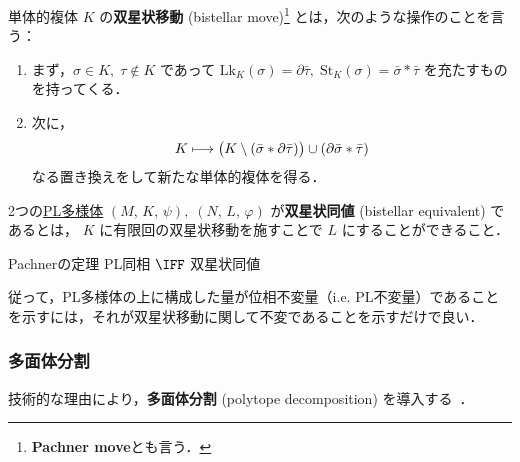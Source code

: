 \documentclass[TQFT_main]{subfiles}
\begin{document}
単体的複体 $K$ の\textbf{双星状移動} (bistellar move)\footnote{\textbf{Pachner move}とも言う．} とは，次のような操作のことを言う：
\begin{enumerate} \label{def:Pachner}
    \item まず，$\sigma \in K,\; \tau \notin K$ であって $\mathrm{Lk}_K (\sigma) = \partial \bar{\tau},\; \mathrm{St}_K (\sigma) = \bar{\sigma} * \bar{\tau}$ を充たすものを持ってくる．
    \item 次に，
    \begin{align}
        K \longmapsto \bigl(K \setminus (\bar{\sigma} * \partial \bar{\tau}) \bigr) \cup (\partial \bar{\sigma} * \bar{\tau})
    \end{align}
    なる置き換えをして新たな単体的複体を得る．
\end{enumerate}
2つの\hyperref[def:PLmfd]{PL多様体} $(M,\, K,\, \psi),\; (N,\, L,\, \varphi)$ が\textbf{双星状同値} (bistellar equivalent) であるとは，
$K$ に有限回の双星状移動を施すことで $L$ にすることができること．

\begin{mytheo}[label=thm:Pachner]{Pachnerの定理}
    PL同相 $\IFF$ 双星状同値
\end{mytheo}

従って，PL多様体の上に構成した量が位相不変量（i.e. PL不変量）であることを示すには，それが双星状移動に関して不変であることを示すだけで良い．

\subsubsection{多面体分割}

技術的な理由により，\textbf{多面体分割} (polytope decomposition) を導入する~\cite[p.11]{KirillovBalsam2010TVBW}．
\end{document}
